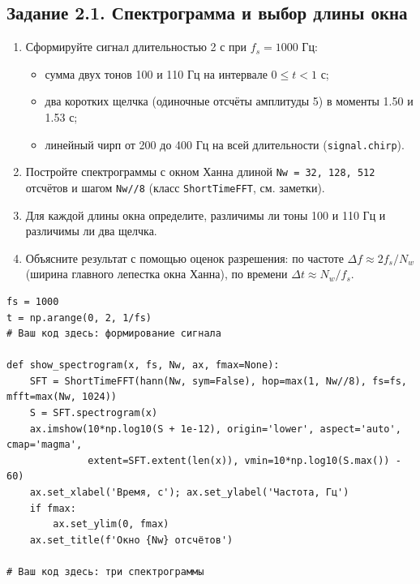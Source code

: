 \documentclass[12pt,a4paper,openany]{book}
\providecommand{\tightlist}{\setlength{\itemsep}{0pt}\setlength{\parskip}{0pt}}
\begin{document}
\subsection*{Задание 2.1. Спектрограмма и выбор длины окна}

\begin{enumerate}
\def\labelenumi{\arabic{enumi}.}
\tightlist
\item
  Сформируйте сигнал длительностью 2 с при \(f_s = 1000\) Гц:

  \begin{itemize}
  \tightlist
  \item
    сумма двух тонов 100 и 110 Гц на интервале \(0 \le t < 1\) с;
  \item
    два коротких щелчка (одиночные отсчёты амплитуды 5) в моменты 1.50 и 1.53 с;
  \item
    линейный чирп от 200 до 400 Гц на всей длительности (\texttt{signal.\allowbreak{}chirp}).
  \end{itemize}
\item
  Постройте спектрограммы с окном Ханна длиной \texttt{Nw\ =\allowbreak{}\ 32,\allowbreak{}\ 128,\allowbreak{}\ 512} отсчётов и шагом \texttt{Nw/\allowbreak{}/\allowbreak{}8} (класс \texttt{ShortTimeFFT}, см. заметки).
\item
  Для каждой длины окна определите, различимы ли тоны 100 и 110 Гц и различимы ли два щелчка.
\item
  Объясните результат с помощью оценок разрешения: по частоте \(\Delta f \approx 2f_s/N_w\) (ширина главного лепестка окна Ханна), по времени \(\Delta t \approx N_w/f_s\).
\end{enumerate}

\begin{Verbatim}[fontsize=\small, breaklines, breakanywhere, frame=single, framesep=2mm]
fs = 1000
t = np.arange(0, 2, 1/fs)
# Ваш код здесь: формирование сигнала

def show_spectrogram(x, fs, Nw, ax, fmax=None):
    SFT = ShortTimeFFT(hann(Nw, sym=False), hop=max(1, Nw//8), fs=fs, mfft=max(Nw, 1024))
    S = SFT.spectrogram(x)
    ax.imshow(10*np.log10(S + 1e-12), origin='lower', aspect='auto', cmap='magma',
              extent=SFT.extent(len(x)), vmin=10*np.log10(S.max()) - 60)
    ax.set_xlabel('Время, с'); ax.set_ylabel('Частота, Гц')
    if fmax:
        ax.set_ylim(0, fmax)
    ax.set_title(f'Окно {Nw} отсчётов')

# Ваш код здесь: три спектрограммы
\end{Verbatim}
\end{document}
